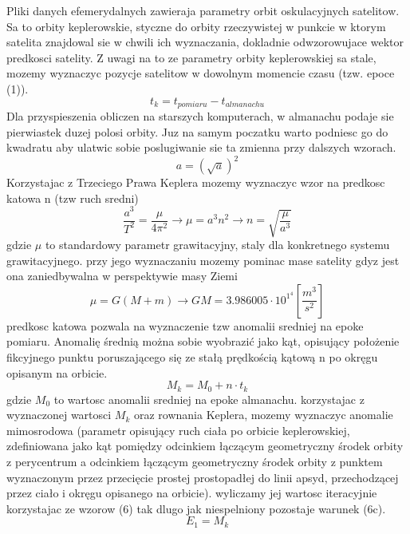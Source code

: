 \documentclass[twocolumn]{article}
\begin{document}
Pliki danych efemerydalnych zawieraja parametry orbit oskulacyjnych satelitow. Sa to orbity keplerowskie, styczne do orbity rzeczywistej w punkcie w ktorym satelita znajdowal sie w chwili ich wyznaczania, dokladnie odwzorowujace wektor predkosci satelity. Z uwagi na to ze parametry orbity keplerowskiej sa stale, mozemy wyznaczyc pozycje satelitow w dowolnym momencie czasu (tzw. epoce (1)).
\begin{equation}
t_k=t_{pomiaru}-t_{almanachu}
\end{equation}
Dla przyspieszenia obliczen na starszych komputerach, w almanachu podaje sie pierwiastek duzej polosi orbity. Juz na samym poczatku warto podniesc go do kwadratu aby ulatwic sobie poslugiwanie sie ta zmienna przy dalszych wzorach.
\begin{equation}
a=(\sqrt{a})^2
\end{equation}
Korzystajac z Trzeciego Prawa Keplera mozemy wyznaczyc wzor na predkosc katowa n (tzw ruch sredni)
\begin{equation}
\frac{a^3}{T^2}=\frac{\mu}{4\pi^2}\to\mu=a^3n^2\to n=\sqrt{\frac{\mu}{a^3}} 
\end{equation}
gdzie \(\mu\) to standardowy parametr grawitacyjny, staly dla konkretnego systemu grawitacyjnego. przy jego wyznaczaniu mozemy pominac mase satelity gdyz jest ona zaniedbywalna w perspektywie masy Ziemi
\begin{equation}
\mu = G(M+m) \to GM = 3.986005\cdot10^1^4[\frac{m^3}{s^2}]
\end{equation}
predkosc katowa pozwala na wyznaczenie tzw anomalii sredniej na epoke pomiaru. Anomalię średnią można sobie wyobrazić jako kąt, opisujący położenie fikcyjnego punktu poruszającego się ze stałą prędkością kątową n po okręgu opisanym na orbicie.
\begin{equation}
M_k=M_0+n\cdot t_k
\end{equation}
gdzie \(M_0\) to wartosc anomalii sredniej na epoke almanachu. korzystajac z wyznaczonej wartosci \(M_k\) oraz rownania Keplera, mozemy wyznaczyc anomalie mimosrodowa (parametr opisujący ruch ciała po orbicie keplerowskiej, zdefiniowana jako kąt pomiędzy odcinkiem łączącym geometryczny środek orbity z perycentrum a odcinkiem łączącym geometryczny środek orbity z punktem wyznaczonym przez przecięcie prostej prostopadłej do linii apsyd, przechodzącej przez ciało i okręgu opisanego na orbicie). wyliczamy jej wartosc iteracyjnie korzystajac ze wzorow (6) tak dlugo jak niespelniony pozostaje warunek (6c).
\begin{equation}
E_1=M_k
\end{equation}
\end{document}
